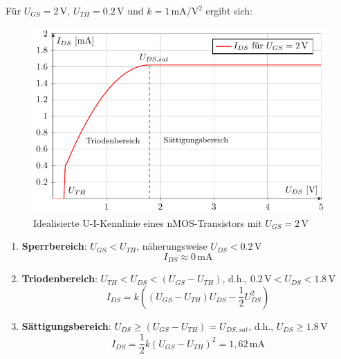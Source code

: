 \documentclass{scrarticle}
\numberwithin{equation}{section}
\begin{document}
Für \( U_{GS} = 2\,\mathrm{V} \), \( U_{TH} = 0.2\,\mathrm{V} \) und \( k = 1\,\mathrm{mA/V^2} \) ergibt sich:
\begin{figure}[h]
	\centering
	\label{fig:kennlinie}
	\includegraphics[scale=1.0]{tkiz/ui-kennlinie.pdf}
	\caption{Idealisierte U-I-Kennlinie eines nMOS-Transistors mit $U_{GS} = 2\,\mathrm{V}$}
\end{figure}
\begin{enumerate}
	\renewcommand{\labelenumi}{} %
	\item \textbf{Sperrbereich}: $U_{GS} < U_{TH}$, näherungsweise $U_{DS} < 0.2\,\mathrm{V}$ \\
	\[
	I_{DS} \approx 0\,\mathrm{mA}
	\]
	\item \textbf{Triodenbereich}: $U_{TH} < U_{DS} < (U_{GS} - U_{TH})$, d.h., $0.2\,\mathrm{V} < U_{DS} < 1.8\,\mathrm{V}$ \\
	\[
	I_{DS} = k \left((U_{GS} - U_{TH}) U_{DS} - \frac{1}{2} U_{DS}^2\right)
	\]
	\item \textbf{Sättigungsbereich}: $U_{DS} \ge (U_{GS} - U_{TH}) = U_{DS,sat}$, d.h., $U_{DS} \ge 1.8\,\mathrm{V}$ \\
	\[
	I_{DS} = \frac{1}{2} k (U_{GS} - U_{TH})^2 = 1,62\,\mathrm{mA}
	\]
\end{enumerate}
\end{document}
